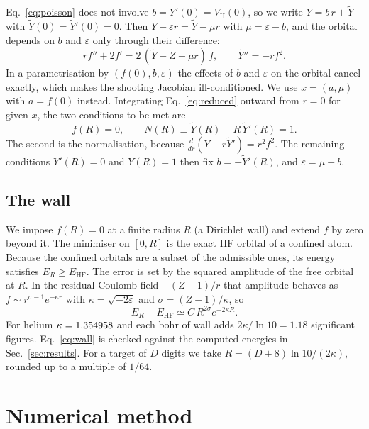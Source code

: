 \documentclass[aps,pra,reprint,superscriptaddress,amsmath,amssymb,longbibliography]{revtex4-2}
\newcommand{\EHF}{E_\mathrm{HF}}
\begin{document}
Eq.~\eqref{eq:poisson} does not involve $b=Y'(0)=V_\mathrm H(0)$, so we write $Y=b\,r+\tilde Y$ with $\tilde Y(0)=\tilde Y'(0)=0$. Then $Y-\varepsilon r=\tilde Y-\mu r$ with $\mu=\varepsilon-b$, and the orbital depends on $b$ and $\varepsilon$ only through their difference:
\begin{equation}
r f''+2f'=2\,(\tilde Y-Z-\mu r)\,f,\qquad \tilde Y''=-rf^2. \label{eq:reduced}
\end{equation}
In a parametrisation by $(f(0),b,\varepsilon)$ the effects of $b$ and $\varepsilon$ on the orbital cancel exactly, which makes the shooting Jacobian ill-conditioned. We use $x=(a,\mu)$ with $a=f(0)$ instead. Integrating Eq.~\eqref{eq:reduced} outward from $r=0$ for given $x$, the two conditions to be met are
\begin{equation}
f(R)=0,\qquad N(R)\equiv\tilde Y(R)-R\,\tilde Y'(R)=1. \label{eq:conditions}
\end{equation}
The second is the normalisation, because $\frac{d}{dr}(\tilde Y-r\tilde Y')=r^2f^2$. The remaining conditions $Y'(R)=0$ and $Y(R)=1$ then fix $b=-\tilde Y'(R)$, and $\varepsilon=\mu+b$.

\subsection{The wall}

We impose $f(R)=0$ at a finite radius $R$ (a Dirichlet wall) and extend $f$ by zero beyond it. The minimiser on $[0,R]$ is the exact HF orbital of a confined atom. Because the confined orbitals are a subset of the admissible ones, its energy satisfies $E_R\ge\EHF$. The error is set by the squared amplitude of the free orbital at $R$. In the residual Coulomb field $-(Z-1)/r$ that amplitude behaves as $f\sim r^{\sigma-1}e^{-\kappa r}$ with $\kappa=\sqrt{-2\varepsilon}$ and $\sigma=(Z-1)/\kappa$, so
\begin{equation}
E_R-\EHF\simeq C\,R^{2\sigma}e^{-2\kappa R}. \label{eq:wall}
\end{equation}
For helium $\kappa=1.354958$ and each bohr of wall adds $2\kappa/\ln10=1.18$ significant figures. Eq.~\eqref{eq:wall} is checked against the computed energies in Sec.~\ref{sec:results}. For a target of $D$ digits we take $R=(D+8)\ln10/(2\kappa)$, rounded up to a multiple of $1/64$.

\section{Numerical method}\label{sec:numerics}
\end{document}
